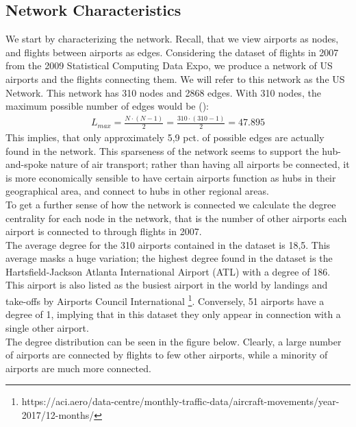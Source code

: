 \label{sec:empirical}
\subsection{Network Characteristics}
We start by characterizing the network. Recall, that we view airports as nodes, and flights between airports as edges. Considering the dataset of flights in 2007 from the 2009 Statistical Computing Data Expo, we produce a network of US airports and the flights connecting them. We will refer to this network as the US Network. This network has 310 nodes and 2868 edges. With 310 nodes, the maximum possible number of edges would be (\cite{Barabasi Networks}): 
\begin{align}
    L_{max}  = \frac{N\cdot(N-1)}{2}=\frac{310\cdot(310-1)}{2} = 47.895
\end{align}
This implies, that only approximately 5,9 pct. of possible edges are actually found in the network. 
This sparseness of the network seems to support the hub-and-spoke nature of air transport; rather than having all airports be connected, it is more economically sensible to have certain airports function as hubs in their geographical area, and connect to hubs in other regional areas. \\ 
To get a further sense of how the network is connected we calculate the degree centrality for each node in the network, that is the number of other airports each airport is connected to through flights in 2007. \\
The average degree for the 310 airports contained in the dataset is 18,5. This average masks a huge variation; the highest degree found in the dataset is the Hartsfield-Jackson Atlanta International Airport (ATL) with a degree of 186. This airport is also listed as the busiest airport in the world by landings and take-offs by Airports Council International \footnote{https://aci.aero/data-centre/monthly-traffic-data/aircraft-movements/year-2017/12-months/}. Conversely, 51 airports have a degree of 1, implying that in this dataset they only appear in connection with a single other airport. \\
The degree distribution can be seen in the figure below. Clearly, a large number of airports are connected by flights to few other airports, while a minority of airports are much more connected. \\

